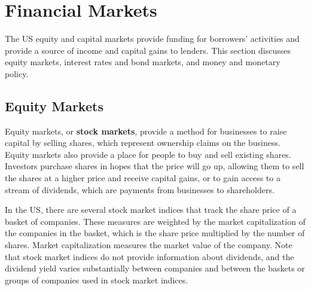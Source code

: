 \documentclass{report}
\begin{document}
{\section*{Financial Markets}
\begin{minipage}{0.76\textwidth}
\vspace{-1mm}
\small The US equity and capital markets provide funding for borrowers' activities and provide a source of income and capital gains to lenders. This section discusses equity markets, interest rates and bond markets, and money and monetary policy. 
\hypertarget{capeq}{\label{capeq}}
\subsection*{Equity Markets}
    
\small Equity markets, or \textbf{stock markets}, provide a method for businesses to raise capital by selling shares, which represent ownership claims on the business. Equity markets also provide a place for people to buy and sell existing shares. Investors purchase shares in hopes that the price will go up, allowing them to sell the shares at a higher price and receive capital gains, or to gain access to a stream of dividends, which are payments from businesses to shareholders. 

In the US, there are several stock market indices that track the share price of a basket of companies. These measures are weighted by the market capitalization of the companies in the basket, which is the share price multiplied by the number of shares. Market capitalization measures the market value of the company. Note that stock market indices do not provide information about dividends, and the dividend yield varies substantially between companies and between the baskets or groups of companies used in stock market indices.
\vspace{2mm}


\end{minipage}}
\end{document}
